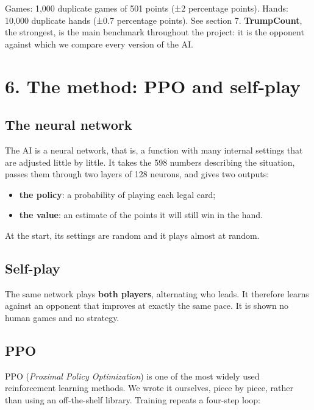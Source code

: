 Games: 1,000 duplicate games of 501 points (±2 percentage points). Hands: 10,000 duplicate hands (±0.7 percentage points). See section 7. \textbf{TrumpCount}, the strongest, is the main benchmark throughout the project: it is the opponent against which we compare every version of the AI.

\section*{6. The method: PPO and self-play}

\subsection*{The neural network}

The AI is a neural network, that is, a function with many internal settings that are adjusted little by little. It takes the 598 numbers describing the situation, passes them through two layers of 128 neurons, and gives two outputs:

\begin{itemize}

  \item \textbf{the policy}: a probability of playing each legal card;

  \item \textbf{the value}: an estimate of the points it will still win in the hand.

\end{itemize}

At the start, its settings are random and it plays almost at random.

\subsection*{Self-play}

The same network plays \textbf{both players}, alternating who leads. It therefore learns against an opponent that improves at exactly the same pace. It is shown no human games and no strategy.

\subsection*{PPO}

PPO (\emph{Proximal Policy Optimization}) is one of the most widely used reinforcement learning methods. We wrote it ourselves, piece by piece, rather than using an off-the-shelf library. Training repeats a four-step loop:

